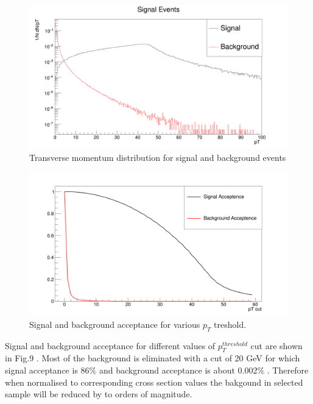 \documentclass[12pt,a4paper]{article}		%
\begin{document}
\begin{figure}[h]
	\begin{center}
		\includegraphics[scale=0.17]{pT.png} 
		\caption{Transverse momentum distribution for signal and background events}		
	\end{center}
	\centering	
\end{figure}						    
\begin{figure}[h]
	\begin{center}
		\includegraphics[scale=0.17]{acceptence.png} 	
		\caption{Signal and background acceptance for various $p_T$ treshold.}		
	\end{center}
	\centering	
\end{figure}						    

Signal and background acceptance for different values of  $p_T^{threshold}$ cut are shown in Fig.9 . Most of the background is eliminated with a cut of 20 GeV for which signal acceptance is 86$\%$ and background acceptance is about 0.002$\%$ . Therefore when normalised to corresponding cross section values the bakgound in selected sample will be reduced by to orders of magnitude. 
\end{document}
